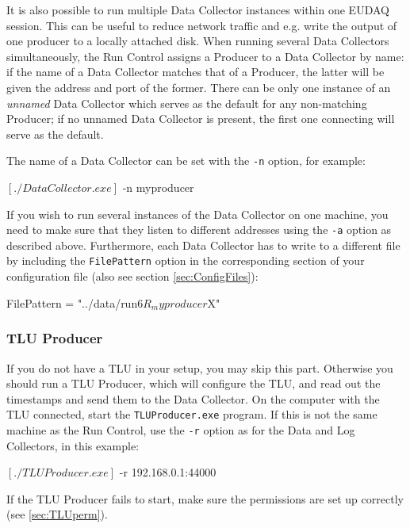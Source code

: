 It is also possible to run multiple Data Collector instances within
one EUDAQ session. 
This can be useful to reduce network traffic and
e.g. write the output of one producer to a locally attached disk. 
When running several Data Collectors simultaneously, the Run Control assigns a
Producer to a Data Collector by name: if the name of a Data Collector
matches that of a Producer, the latter will be given the address and
port of the former. 
There can be only one instance of an \emph{unnamed} Data
Collector which serves as the default for any non-matching Producer;
if no unnamed Data Collector is present, the first one connecting will
serve as the default.

The name of a Data Collector can be set with the
\texttt{-n} option, for example:
\begin{listing}[mybash]
$[./DataCollector.exe]$ -n myproducer
\end{listing}

If you wish to run several instances of the Data Collector on one
machine, you need to make sure that they listen to different addresses
using the \texttt{-a} option as described above. 
Furthermore, each Data Collector has to write to a different file by including the
\texttt{FilePattern} option in the corresponding section of your
configuration file (also see section \ref{sec:ConfigFiles}):

\begin{listing}
FilePattern = "../data/run$6R_myproducer$X"
\end{listing}

\subsubsection{TLU Producer}
\label{sec:tluproducer}
If you do not have a \gls{TLU} in your setup, you may skip this part.
Otherwise you should run a TLU Producer, which will configure the \gls{TLU},
and read out the timestamps and send them to the Data Collector.
On the computer with the \gls{TLU} connected, start the \texttt{TLUProducer.exe} program.
If this is not the same machine as the Run Control,
use the \texttt{-r} option as for the Data and Log Collectors, in this example:
\begin{listing}[mybash]
$[./TLUProducer.exe]$ -r 192.168.0.1:44000
\end{listing}
If the TLU Producer fails to start, make sure the permissions are set up correctly (see \autoref{sec:TLUperm}).

